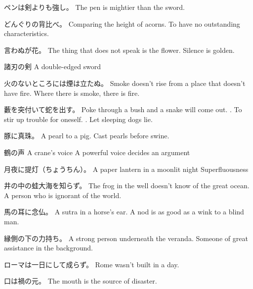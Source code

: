 \par{ペンは剣よりも強し。 \hfill\break
The pen is mightier than the sword. }

\par{どんぐりの背比べ。 \hfill\break
Comparing the height of acorns. \hfill\break
To have no outstanding characteristics. }

\par{言わぬが花。 \hfill\break
The thing that does not speak is the flower. \hfill\break
Silence is golden. }

\par{諸刃の剣 \hfill\break
A double-edged sword }

\par{火のないところには煙は立たぬ。 \hfill\break
Smoke doesn't rise from a place that doesn't have fire. \hfill\break
Where there is smoke, there is fire. }

\par{藪を突付いて蛇を出す。 \hfill\break
Poke through a bush and a snake will come out. \hfill{}. To stir up trouble for oneself. \hfill{}. Let sleeping dogs lie. }

\par{豚に真珠。 \hfill\break
A pearl to a pig. \hfill\break
Cast pearls before swine. }

\par{鶴の声 \hfill\break
A crane's voice \hfill\break
A powerful voice decides an argument }

\par{月夜に提灯（ちょうちん）。 \hfill\break
A paper lantern in a moonlit night \hfill\break
Superfluousness }

\par{井の中の蛙大海を知らず。 \hfill\break
The frog in the well doesn't know of the great ocean. \hfill\break
A person who is ignorant of the world. }

\par{馬の耳に念仏。 \hfill\break
A sutra in a horse's ear. \hfill\break
A nod is as good as a wink to a blind man. }

\par{縁側の下の力持ち。 \hfill\break
A strong person underneath the veranda. \hfill\break
Someone of great assistance in the background. }

\par{ローマは一日にして成らず。 \hfill\break
Rome wasn't built in a day. }

\par{口は禍の元。 \hfill\break
The mouth is the source of disaster. }

